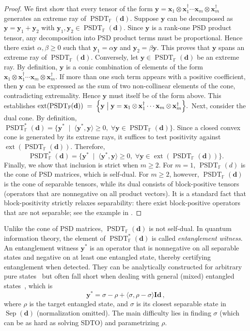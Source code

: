 \documentclass[smallextended]{svjour3}
\newcommand{\F}{\mathbb F}
\DeclareMathOperator{\sep}{Sep}
\DeclareMathOperator{\SOST}{PSDT}
\newcommand{\1}{\mathbf{1}}
\newcommand{\x}{\mathbf{x}}
\newcommand{\y}{\mathbf{y}}
\newcommand{\Id}{\mathbf{Id}}
\DeclareMathOperator{\ext}{ext}
\DeclareMathOperator{\mtens}{\otimes}
\newcommand{\inner}[2]{\langle #1, #2 \rangle}
\newcommand{\vc}[1]{\mathbf{#1}}
\newcommand{\vd}{\vc{d}}
\begin{document}
\begin{proof}
  We first show that every tensor of the form
  $
    \y = \x_{1} \mtens \x_{1}^\dagger \cdots \x_{m} \mtens \x_{m}^\dagger
$
  generates an extreme ray of $\SOST_{\F}(\vd)$.
  Suppose $\y$ can be decomposed as $\y = \y_1 + \y_2$ with $\y_1, \y_2 \in \SOST_{\F}(\vd)$.
  Since $\y$ is a rank-one PSD product tensor, any decomposition into PSD product terms must be proportional. Hence there exist $\alpha, \beta \ge 0$ such that $\y_1 = \alpha \y$ and $\y_2 = \beta \y$.
  This proves that $\y$ spans an extreme ray of $\SOST_{\F}(\vd)$. Conversely, let $\y \in \SOST_{\F}(\vd)$ be an extreme ray.
  By definition, $\y$ is a conic combination of elements of the form
  $\x_{1} \mtens \x_{1}^\dagger \cdots \x_{m} \mtens \x_{m}^\dagger$.
  If more than one such term appears with a positive coefficient, then $\y$ can be expressed as the sum of two non-collinear elements of the cone, contradicting extremality.
  Hence $\y$ must itself be of the form above.
  This establishes
$
    \ext(\SOST_{\F}(\vd)) \;=\; \Bigl\{\y \;\big|\; \y = \x_{1} \mtens \x_{1}^\dagger \cdots \x_{m} \mtens \x_{m}^\dagger \Bigr\}.
$
Next, consider the dual cone.
  By definition, $
    \SOST^*_{\F}(\vd) = \{\y^* \;\mid\; \inner{\y^\ast}{\y} \ge 0, \;\forall \y \in \SOST_{\F}(\vd)\}.
  $
  Since a closed convex cone is generated by its extreme rays, it suffices to test positivity against $\ext(\SOST_{\F}(\vd))$.
  Therefore,
  \[
    \SOST^*_{\F}(\vd) = \{\y^* \;\mid\; \inner{\y^\ast}{\y} \ge 0, \;\forall \y \in \ext(\SOST_{\F}(\vd))\}.
  \]
Finally, we show that inclusion is strict when $m \ge 2$.
  For $m=1$, $\SOST_{\F}(d)$ is the cone of PSD matrices, which is self-dual.
  For $m \ge 2$, however, $\SOST_{\F}(\vd)$ is the cone of separable tensors, while its dual consists of block-positive tensors (operators that are nonnegative on all product vectors).
  It is a standard fact that block-positivity strictly relaxes separability: there exist block-positive operators that are not separable; see the example in \cite{peres1996separability}.
\end{proof}

Unlike the cone of PSD matrices, $\SOST_{\F}(\vd)$ is not self-dual.
In quantum information theory, the element of  $\SOST^*_{\F}(\vd)$ is called \textit{entanglement witness}.
An entanglement witness $\y^*$ is an operator that is nonnegative on all separable states and negative on at least one entangled state, thereby certifying entanglement when detected.
They can be analytically constructed for arbitrary pure states~\cite{Bourennane2004experimental} but often fall short when dealing with general (mixed) entangled states~\cite{Bertlmann2005optimal,Bertlmann2002geometric,Pittenger2001convexity}, which is
\begin{equation}
    \y^* = \sigma - \rho + \inner{\sigma}{\rho - \sigma}  \Id\,,
\end{equation}
where $\rho$ is the target entangled state, and $\sigma$ is its closest separable state in $\sep(\vd)$ (normalization omitted).
The main difficulty lies in finding $\sigma$ (which can be as hard as solving SDTO) and parametrizing $\rho$.
\end{document}
